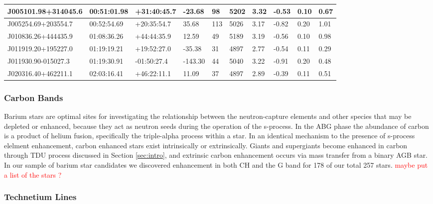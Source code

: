 \documentclass[a4paper,fleqn,usenatbib]{mnras}
\newcommand{\todo}[1]{\textcolor{red}{#1}}
\begin{document}
\begin{table}[]
\begin{tabular}{@{}|l|l|l|l|l|l|l|l|l|l|@{}}
J005101.98+314045.6 & 00:51:01.98 & +31:40:45.7 & -23.68    & 98  & 5202 & 3.32  & -0.53      & 0.10      & 0.67 \\ \midrule
J005254.69+203554.7 & 00:52:54.69 & +20:35:54.7 & 35.68     & 113 & 5026 & 3.17  & -0.82      & 0.20      & 1.01 \\ \midrule
J010836.26+444435.9 & 01:08:36.26 & +44:44:35.9 & 12.59     & 49  & 5189 & 3.19  & -0.56      & 0.10      & 0.98 \\ \midrule
J011919.20+195227.0 & 01:19:19.21 & +19:52:27.0 & -35.38    & 31  & 4897 & 2.77  & -0.54      & 0.11      & 0.29 \\ \midrule
J011930.90-015027.3 & 01:19:30.91 & -01:50:27.4 & -143.30   & 44  & 5040 & 3.22  & -0.91      & 0.20      & 0.48 \\ \midrule
J020316.40+462211.1 & 02:03:16.41 & +46:22:11.1 & 11.09     & 37  & 4897 & 2.89  & -0.39      & 0.11      & 0.51 \\ \bottomrule
\end{tabular}
\end{table}


\subsubsection{Carbon Bands}

Barium stars are optimal sites for investigating the relationship between the neutron-capture elements and other species that may be
depleted or enhanced, because they act as neutron seeds during the operation of the s-process. In the ABG phase the abundance of carbon is a product of helium fusion, specifically the triple-alpha process within a star. In an identical mechanism to the presence of s-process elelment enhancement, carbon enhanced stars exist intrinsically or extrinsically. Giants and supergiants become enhanced in carbon through TDU process discussed in Section \ref{sec:intro}, and extrinsic carbon enhancement occurs via mass transfer from a binary AGB star. In our sample of barium star candidates we discovered enhancement in both CH and the G band for 178 of our total 257 stars. \todo{maybe put a list of the stars ?}



\subsubsection{Technetium Lines}
\end{document}
